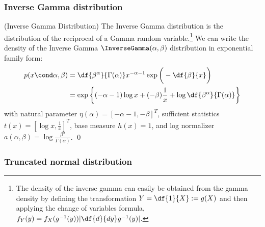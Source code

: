 \documentclass{article} %
\begin{document}

\subsubsection{Inverse Gamma distribution}

\begin{example}{(Inverse Gamma Distribution)} 
\label{ex:inverse_gamma_as_ef} The Inverse Gamma distribution is the distribution of the reciprocal of a Gamma random variable.\footnote{The density of the inverse gamma can easily be obtained from the gamma density by defining the transformation $Y = \df{1}{X} := g(X)$ and then applying the change of variables formula,  $f_Y(y) = f_X (g^{-1}(y)) | \df{d}{dy} g^{-1}(y)|$.}  We can write the density of the Inverse Gamma $\InverseGamma(\alpha,  \beta)$ distribution in exponential family form:
\begin{align*}
p (x \cond \alpha,  \beta) &= \df{\beta^\alpha}{ \Gamma (\alpha) } x^{-\alpha -1} \exp \bigg(- \df{\beta}{x} \bigg) \\
&= \exp \bigg\{ (-\alpha - 1) \log x + (- \beta) \frac{1}{x} + \log \df{\beta^\alpha}{\Gamma(\alpha)} \bigg\}
\end{align*}
with natural parameter $\eta(\alpha) = [-\alpha-1,  -\beta]^T$, sufficient statistics $t(x) = [\log x ,  \frac{1}{x}]^T$, base measure $h(x)=1$, and log normalizer $a(\alpha,  \beta) =  \log \frac{\beta^\alpha}{\Gamma(\alpha)} $. 
\qed 
\end{example} 


\subsubsection{Truncated normal distribution}
\end{document}
